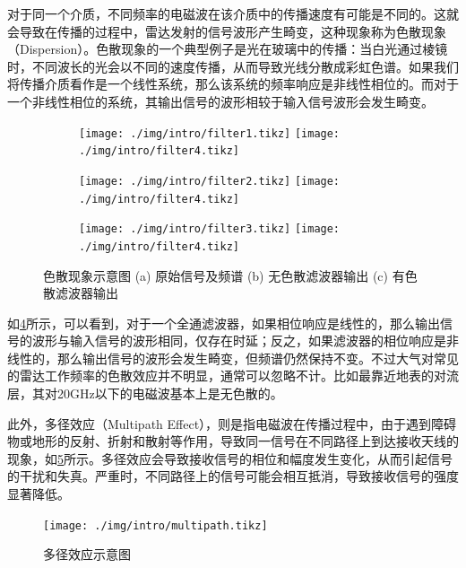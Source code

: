 对于同一个介质，不同频率的电磁波在该介质中的传播速度有可能是不同的。这就会导致在传播的过程中，雷达发射的信号波形产生畸变，这种现象称为色散现象（Dispersion）。色散现象的一个典型例子是光在玻璃中的传播：当白光通过棱镜时，不同波长的光会以不同的速度传播，从而导致光线分散成彩虹色谱。如果我们将传播介质看作是一个线性系统，那么该系统的频率响应是非线性相位的。而对于一个非线性相位的系统，其输出信号的波形相较于输入信号波形会发生畸变。
\begin{figure}[htb!]
    \centering
    \begin{subfigure}{.3\textwidth}
        \centering
        \texttt{[image: ./img/intro/filter1.tikz]}
        \texttt{[image: ./img/intro/filter4.tikz]}
        \caption{}
        \label{fig_chp1_filter_1}
    \end{subfigure}
    \begin{subfigure}{.3\textwidth}
        \centering
        \texttt{[image: ./img/intro/filter2.tikz]}
        \texttt{[image: ./img/intro/filter4.tikz]}
        \caption{}
        \label{fig_chp1_filter_2}
    \end{subfigure}
    \begin{subfigure}{.3\textwidth}
        \centering
        \texttt{[image: ./img/intro/filter3.tikz]}
        \texttt{[image: ./img/intro/filter4.tikz]}
        \caption{}
        \label{fig_chp1_filter_3}
    \end{subfigure}
    \caption{色散现象示意图 (a) 原始信号及频谱 (b) 无色散滤波器输出 (c) 有色散滤波器输出}
    \label{fig_chp1_filter}
\end{figure}

如\cref{fig_chp1_filter}所示，可以看到，对于一个全通滤波器，如果相位响应是线性的，那么输出信号的波形与输入信号的波形相同，仅存在时延；反之，如果滤波器的相位响应是非线性的，那么输出信号的波形会发生畸变，但频谱仍然保持不变。不过大气对常见的雷达工作频率的色散效应并不明显，通常可以忽略不计。比如最靠近地表的对流层，其对20GHz以下的电磁波基本上是无色散的。

此外，多径效应（Multipath Effect），则是指电磁波在传播过程中，由于遇到障碍物或地形的反射、折射和散射等作用，导致同一信号在不同路径上到达接收天线的现象，如\cref{fig_chp1_multipath}所示。多径效应会导致接收信号的相位和幅度发生变化，从而引起信号的干扰和失真。严重时，不同路径上的信号可能会相互抵消，导致接收信号的强度显著降低。

\begin{figure}[htb!]
    \centering
    \texttt{[image: ./img/intro/multipath.tikz]}
    \caption{多径效应示意图}
    \label{fig_chp1_multipath}
\end{figure}

